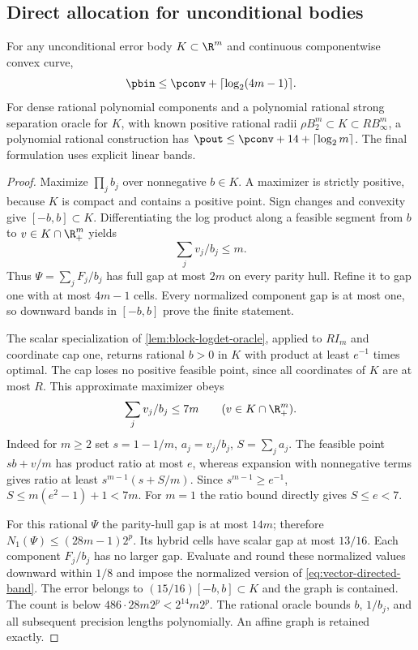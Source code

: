 \subsection{Direct allocation for unconditional bodies}

\begin{proposition}\label{prop:vector-log-product}
For any unconditional error body $K\subset\R^m$ and continuous
componentwise convex curve,
\[
 \pbin\le\pconv+\lceil\log_2(4m-1)\rceil.
\]
For dense rational polynomial components and a polynomial rational
strong separation oracle for $K$, with known positive rational radii
$\rho B_2^m\subset K\subset R B_\infty^m$, a polynomial rational
construction has $\pout\le\pconv+14+\lceil\log_2m\rceil$.
The final formulation uses explicit linear bands.
\end{proposition}
\begin{proof}
Maximize $\prod_j b_j$ over nonnegative $b\in K$. A maximizer is
strictly positive, because $K$ is compact and contains a positive
point. Sign changes and convexity give $[-b,b]\subset K$.
Differentiating the log product along a feasible segment from $b$ to
$v\in K\cap\R_+^m$ yields
\begin{equation}\label{eq:product-support}
 \sum_jv_j/b_j\le m.
\end{equation}
Thus $\Psi=\sum_jF_j/b_j$ has full gap at most $2m$ on every parity
hull. Refine it to gap one with at most $4m-1$ cells. Every normalized
component gap is at most one, so downward bands in $[-b,b]$ prove
the finite statement.

The scalar specialization of \cref{lem:block-logdet-oracle}, applied
to $RI_m$ and coordinate cap one, returns rational $b>0$ in $K$ with
product at least $e^{-1}$ times optimal. The cap loses no positive
feasible point, since all coordinates of $K$ are at most $R$.
This approximate maximizer obeys
\begin{equation}\label{eq:approximate-product-support}
 \sum_jv_j/b_j\le7m\qquad(v\in K\cap\R_+^m).
\end{equation}
Indeed for $m\ge2$ set $s=1-1/m$, $a_j=v_j/b_j$, $S=\sum_ja_j$.
The feasible point $sb+v/m$ has product ratio at most $e$, whereas
expansion with nonnegative terms gives ratio at least
$s^{m-1}(s+S/m)$. Since $s^{m-1}\ge e^{-1}$,
$S\le m(e^2-1)+1<7m$. For $m=1$ the ratio bound directly gives
$S\le e<7$.

For this rational $\Psi$ the parity-hull gap is at most $14m$;
therefore $N_1(\Psi)\le(28m-1)2^p$. Its hybrid cells have scalar gap
at most $13/16$. Each component $F_j/b_j$ has no larger gap.
Evaluate and round these normalized values downward within $1/8$
and impose the normalized version of \eqref{eq:vector-directed-band}.
The error belongs to $(15/16)[-b,b]\subset K$ and the graph is
contained. The count is below $486\cdot28m2^p<2^{14}m2^p$.
The rational oracle bounds $b$, $1/b_j$, and all subsequent precision
lengths polynomially. An affine graph is retained exactly.
\end{proof}

